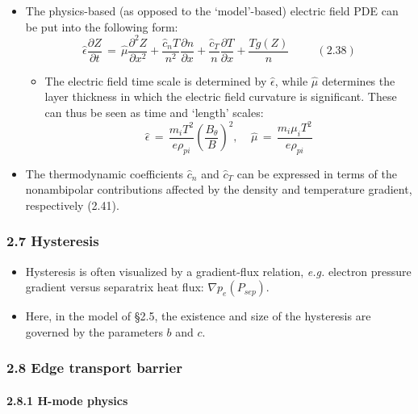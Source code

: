 \documentclass[]{article}
\providecommand{\tightlist}{%
  \setlength{\itemsep}{0pt}\setlength{\parskip}{0pt}}
\let\oldparagraph\paragraph
\renewcommand{\paragraph}[1]{\oldparagraph{#1}\mbox{}}
\begin{document}
\begin{itemize}
\item
  The physics-based (as opposed to the `model'-based) electric field PDE
  can be put into the following form:
  \[\hat{\epsilon} \frac{\partial Z}{\partial t} \,=\, \hat{\mu} \frac{\partial^2 Z}{\partial x^2} + \frac{\hat{c}_n T}{n^2} \frac{\partial n}{\partial x} + \frac{\hat{c}_T}{n} \frac{\partial T}{\partial x} + \frac{T g(Z)}{n} ~~~~~~~~~~~ (2.38)\]

  \begin{itemize}
  \tightlist
  \item
    The electric field time scale is determined by \(\hat{\epsilon}\),
    while \(\hat{\mu}\) determines the layer thickness in which the
    electric field curvature is significant. These can thus be seen as
    time and `length' scales:
    \[\hat{\epsilon} \,=\, \frac{m_i T^2}{e \rho_{pi}} \left(\frac{B_\theta}{B}\right)^2, ~~~~~ \hat{\mu} \,=\, \frac{m_i \mu_i T^2}{e \rho_{pi}}\]
  \end{itemize}
\item
  The thermodynamic coefficients \(\hat{c}_n\) and \(\hat{c}_T\) can be
  expressed in terms of the nonambipolar contributions affected by the
  density and temperature gradient, respectively {(2.41)}.
\end{itemize}

\subsubsection{2.7 Hysteresis}\label{hysteresis}

\begin{itemize}
\item
  Hysteresis is often visualized by a gradient-flux relation,
  \emph{e.g.} electron pressure gradient versus separatrix heat flux:
  \(\nabla p_e(P_{sep})\).
\item
  Here, in the model of §2.5, the existence and size of the hysteresis
  are governed by the parameters \(b\) and \(c\).
\end{itemize}

\subsubsection{2.8 Edge transport barrier}\label{edge-transport-barrier}

\paragraph{2.8.1 H-mode physics}\label{h-mode-physics}
\end{document}
